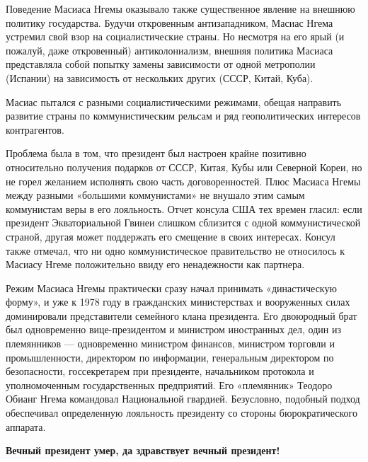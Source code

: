 Поведение Масиаса Нгемы оказывало также существенное явление на внешнюю политику государства. Будучи откровенным антизападником, Масиас Нгема устремил свой взор на социалистические страны. Но несмотря на его ярый (и пожалуй, даже откровенный) антиколониализм, внешняя политика Масиаса представляла собой попытку замены зависимости от одной метрополии (Испании) на зависимость от нескольких других (СССР, Китай, Куба).

\begin{fancyquotes}
    Масиас пытался  с разными социалистическими режимами, обещая  направить развитие страны по коммунистическим рельсам и  ряд геополитических интересов контрагентов.
\end{fancyquotes}

Проблема была в том, что президент был настроен крайне позитивно относительно получения подарков от СССР, Китая, Кубы или Северной Кореи, но не горел желанием исполнять свою часть договоренностей. Плюс  Масиаса Нгемы между разными «большими коммунистами» не внушало этим самым коммунистам веры в его лояльность. Отчет консула США тех времен гласил: если президент Экваториальной Гвинеи слишком сблизится с одной коммунистической страной, другая может поддержать его смещение в своих интересах. Консул также отмечал, что ни одно коммунистическое правительство не относилось к Масиасу Нгеме положительно ввиду его ненадежности как партнера.

Режим Масиаса Нгемы практически сразу начал принимать «династическую форму», и уже к 1978 году в гражданских министерствах и вооруженных силах доминировали представители семейного клана президента. Его двоюродный брат был одновременно вице-президентом и министром иностранных дел, один из племянников --- одновременно министром финансов, министром торговли и промышленности, директором по информации, генеральным директором по безопасности, госсекретарем при президенте, начальником протокола и уполномоченным государственных предприятий. Его «племянник» Теодоро Обианг Нгема командовал Национальной гвардией. Безусловно, подобный подход обеспечивал определенную лояльность президенту со стороны бюрократического аппарата.

\textbf{Вечный президент умер, да здравствует вечный президент!}

